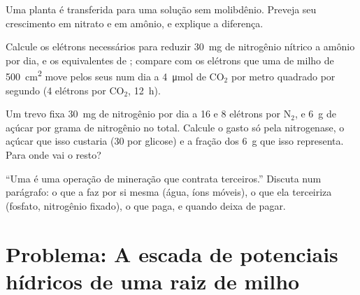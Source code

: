 \begin{exercise}[$\star\star$]\label{exo:b1:plant-water-minerals:9}
Uma planta é transferida para uma solução sem molibdênio. Preveja seu
crescimento em nitrato e em amônio, e explique a diferença.
\end{exercise}

\begin{exercise}[$\star\star\star$]\label{exo:b1:plant-water-minerals:10}
Calcule os elétrons necessários para reduzir \qty{30}{mg} de
nitrogênio nítrico a amônio por dia, e os equivalentes de ;
compare com os elétrons que uma  de milho de \qty{500}{cm^2} move
pelos seus  num dia a \qty{4}{\micro mol} de
$\mathrm{CO_2}$ por metro quadrado por segundo (4 elétrons por
$\mathrm{CO_2}$, \qty{12}{h}).
\end{exercise}

\begin{exercise}[$\star\star\star$]\label{exo:b1:plant-water-minerals:11}
Um trevo fixa \qty{30}{mg} de nitrogênio por dia a \qty{16}{}  e
\qty{8}{} elétrons por $\mathrm{N_2}$, e \qty{6}{g} de açúcar por grama
de nitrogênio no total. Calcule o  gasto só pela nitrogenase, o
açúcar que isso custaria (30  por glicose) e a fração dos
\qty{6}{g} que isso representa. Para onde vai o resto?
\end{exercise}

\begin{exercise}[$\star\star\star$]\label{exo:b1:plant-water-minerals:12}
``Uma  é uma operação de mineração que contrata terceiros.''
Discuta num parágrafo: o que a  faz por si mesma (água, íons
móveis), o que ela terceiriza (fosfato, nitrogênio fixado), o que
paga, e quando deixa de pagar.
\end{exercise}

\section{Problema: A escada de potenciais hídricos de uma raiz de milho}

